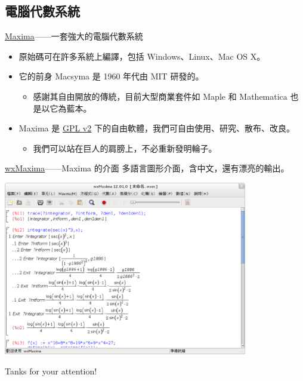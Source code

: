 \documentclass{beamer}
\theoremstyle{remark}
\begin{document}
\begin{CJK}{UTF8}{bsmi}
\section{電腦代數系統}
\begin{frame}{\href{http://maxima.sourceforge.net/}{Maxima}------一套強大的電腦代數系統}
  \begin{itemize}
    \item 原始碼可在許多系統上編譯，包括 Windows、Linux、Mac OS X。
    \item 它的前身 Macsyma 是 1960 年代由 MIT 研發的。
      \begin{itemize}
	\item 感謝其自由開放的傳統，目前大型商業套件如 Maple 和 Mathematica 也是以它為藍本。
      \end{itemize}
    \item Maxima 是 \href{http://www.gnu.org/licenses/gpl-2.0.html}{GPL v2}
      下的自由軟體，我們可自由使用、研究、散布、改良。
      \begin{itemize}
	\item 我們可以站在巨人的肩膀上，不必重新發明輪子。
      \end{itemize}
  \end{itemize}
\end{frame}

\begin{frame}{\href{http://andrejv.github.com/wxmaxima/}{wxMaxima}------Maxima 的介面}
  多語言圖形介面，含中文，還有漂亮的輸出。
  \begin{center}
    \href{http://andrejv.github.com/wxmaxima/}{\includegraphics[width=0.8\textwidth]{screenshot}}
  \end{center}
\end{frame}

\begin{frame}
  \begin{center}
    \huge Tanks for your attention!
  \end{center}
\end{frame}
\end{CJK}
\end{document}
